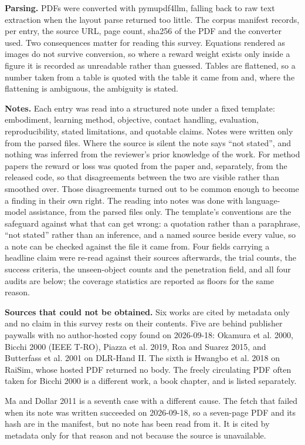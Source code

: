 \textbf{Parsing.}
PDFs were converted with pymupdf4llm, falling back to raw text extraction when the layout parse
returned too little. The corpus manifest records, per entry, the source URL, page count, sha256
of the PDF and the converter used. Two consequences matter for reading this survey. Equations
rendered as images do not survive conversion, so where a reward weight exists only inside a
figure it is recorded as unreadable rather than guessed. Tables are flattened, so a number taken
from a table is quoted with the table it came from and, where the flattening is ambiguous, the
ambiguity is stated.

\textbf{Notes.} Each entry was read into a structured note under a fixed template: embodiment,
learning method, objective, contact handling, evaluation, reproducibility, stated limitations,
and quotable claims. Notes were written only from the parsed files. Where the source is silent
the note says ``not stated'', and nothing was inferred from the reviewer's prior knowledge of
the work. For method papers the reward or loss was quoted from the paper and, separately, from
the released code, so that disagreements between the two are visible rather than smoothed over.
Those disagreements turned out to be common enough to become a finding in their own right. The
reading into notes was done with language-model assistance, from the parsed files only. The
template's conventions are the safeguard against what that can get wrong: a quotation rather
than a paraphrase, ``not stated'' rather than an inference, and a named source beside every
value, so a note can be checked against the file it came from. Four fields carrying a headline
claim were re-read against their sources afterwards, the trial counts, the success criteria, the
unseen-object counts and the penetration field, and all four audits are below; the coverage
statistics are reported as floors for the same reason.

\textbf{Sources that could not be obtained.}
Six works are cited by metadata only and no claim in this survey rests on their contents. Five
are behind publisher paywalls with no author-hosted copy found on 2026-09-18: Okamura et al.
2000, Bicchi 2000 (IEEE T-RO), Piazza et al. 2019, Roa and Suarez 2015, and Butterfass et al.
2001 on DLR-Hand II. The sixth is Hwangbo et al. 2018 on RaiSim, whose hosted PDF returned no
body. The freely circulating PDF often taken for Bicchi 2000 is a different work, a book chapter,
and is listed separately.

Ma and Dollar 2011 is a seventh case with a different cause. The fetch that failed when its note
was written succeeded on 2026-09-18, so a seven-page PDF and its hash are in the manifest, but no
note has been read from it. It is cited by metadata only for that reason and not because the
source is unavailable.

